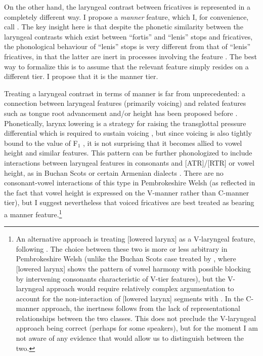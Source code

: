 On the other hand, the laryngeal contrast between fricatives is represented in a completely different way. I propose a \emph{manner} feature, which I, for convenience, call  \citep{trigo91:_phary,youssef10:_laryn_buchan_scots}. The key insight here is that despite the phonetic similarity between the laryngeal contrasts which exist between \enquote{fortis} and \enquote{lenis} stops and fricatives, the phonological behaviour of \enquote{lenis} stops is very different from that of \enquote{lenis} fricatives, in that the latter are inert in processes involving the feature . The best way to formalize this is to assume that the relevant feature simply resides on a different tier. I propose that it is the manner tier.

Treating a laryngeal contrast in terms of manner is far from unprecedented: a connection between laryngeal features (primarily voicing) and related features such as tongue root advancement and/or height has been proposed before \citep{trigo91:_phary,vaux96:_status_atr_featur_geomet,youssef10:_laryn_buchan_scots}. Phonetically, larynx lowering is a strategy for raising the transglottal pressure differential which is required to sustain voicing \citep[\egm][]{riordan80:_laryn_englis,kohler84:_phonet,phon-knowledge}, but since voicing is also tightly bound to the value of F$_{1}$ \citep[\egm][]{kingston08}, it is not surprising that it becomes allied to vowel height and similar features. This pattern can be further phonologized to include interactions between laryngeal features in consonants and [ATR]/[RTR] or vowel height, as in Buchan Scots \citep[\egm][]{kohler84:_phonet,fitzgerald02:_vowel_buchan_scots_englis,paster04:_vowel_buchan_scots,youssef10:_laryn_buchan_scots} or certain Armenian dialects \citep{vaux98:_phonol_armen}. There are no consonant\hyp vowel interactions of this type in Pembrokeshire Welsh (as reflected in the fact that vowel height is expressed on the V\hyp manner rather than C\hyp manner tier), but I suggest nevertheless that voiced fricatives are best treated as bearing a manner feature.\footnote{An alternative approach is treating [lowered larynx] as a V-laryngeal feature, following \citet{youssef10:_laryn_buchan_scots}. The choice between these two is more or less arbitrary in Pembrokeshire Welsh (unlike the Buchan Scots case treated by \citeauthor{youssef10:_laryn_buchan_scots} \cite*{youssef10:_laryn_buchan_scots}, where [lowered larynx] shows the pattern of vowel harmony with possible blocking by intervening consonants characteristic of V-tier features), but the V-laryngeal approach would require relatively complex argumentation to account for the non\hyp interaction of [lowered larynx] segments with . In the C-manner approach, the inertness follows from the lack of representational relationships between the two classes. This does not preclude the V-laryngeal approach being correct (perhaps for some speakers), but for the moment I am not aware of any evidence that would allow us to distinguish between the two.}

